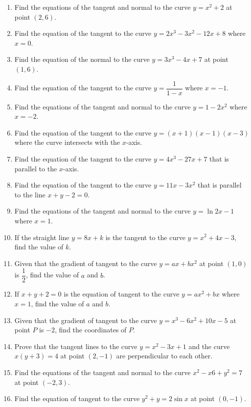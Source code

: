 \documentclass{report}
\begin{document}
\begin{enumerate}
    \item Find the equations of the tangent and normal to the curve $y = x^2 + 2$ at
          point $(2, 6)$.
    \item Find the equation of the tangent to the curve $y = 2x^3 - 3x^2 - 12x + 8$ where
          $x = 0$.
    \item Find the equation of the normal to the curve $y = 3x^3 - 4x + 7$ at point $(1,
              6)$.
    \item Find the equation of the tangent to the curve $y = \dfrac{1}{1-x}$ where $x =
              -1$.
    \item Find the equations of the tangent and normal to the curve $y = 1 - 2x^2$ where
          $x = -2$.
    \item Find the equation of the tangent to the curve $y = (x+1)(x-1)(x-3)$ where the
          curve intersects with the $x$-axis.
    \item Find the equation of the tangent to the curve $y = 4x^3 - 27x + 7$ that is
          parallel to the $x$-axis.
    \item Find the equation of the tangent to the curve $y = 11x - 3x^2$ that is parallel
          to the line $x + y - 2 = 0$.
    \item Find the equations of the tangent and normal to the curve $y = \ln{2x - 1}$
          where $x=1$.
    \item If the straight line $y = 8x + k$ is the tangent to the curve $y = x^2 + 4x -
              3$, find the value of $k$.
    \item Given that the gradient of tangent to the curve $y = ax + bx^2$ at point $(1,
              0)$ is $\dfrac{1}{2}$, find the value of $a$ and $b$.
    \item If $x + y + 2 = 0$ is the equation of tangent to the curve $y = ax^2 + bx$
          where $x = 1$, find the value of $a$ and $b$.
    \item Given that the gradient of tangent to the curve $y = x^3 - 6x^2 + 10x - 5$ at
          point $P$ is $-2$, find the coordinates of $P$.
    \item Prove that the tangent lines to the curve $y = x^2 - 3x + 1$ and the curve
          $x(y+3) = 4$ at point $(2, -1)$ are perpendicular to each other.
    \item Find the equations of the tangent and normal to the curve $x^2 - x6 + y^2 = 7$
          at point $(-2, 3)$.
    \item Find the equation of tangent to the curve $y^2 + y = 2\sin x$ at point $(0,
              -1)$.

\end{enumerate}
\end{document}
